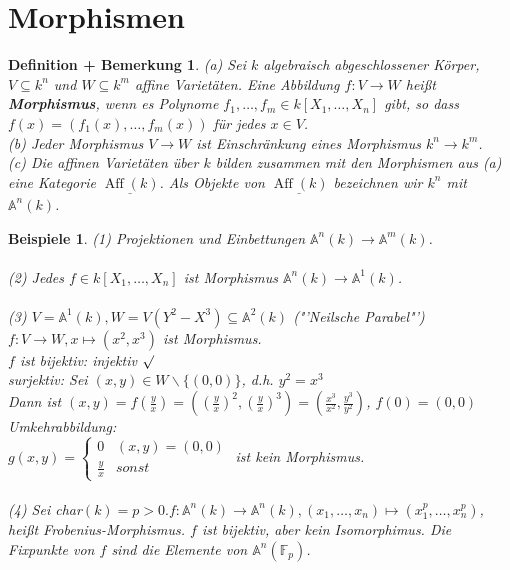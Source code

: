 \documentclass[a4paper,12pt]{report}
\theoremstyle{break}
\newtheorem{DefBem}[Def]{Definition + Bemerkung}
\newtheorem{Bsp}[Def]{Beispiele}
\theoremstyle{nonumberbreak}
\theoremstyle{nonumberplain}
\newcommand{\emp}[1]{\textbf{\emph{#1}}}
\newcommand{\begriff}[1]{{\index{#1}}\emp{#1}}
\begin{document}
\section{Morphismen}
\begin{DefBem}
(a) Sei $k$ algebraisch abgeschlossener Körper, $V\subseteq k^n$ und $W\subseteq k^m$ affine Varietäten. Eine Abbildung $f:V\rightarrow W$ heißt \begriff{Morphismus}, wenn es Polynome $f_1,\dots,f_m\in k[X_1,\dots,X_n]$ gibt, so dass $f(x)=(f_1(x),\dots,f_m(x))$ für jedes $x\in V$.\\
(b) Jeder Morphismus $V\rightarrow W$ ist Einschränkung eines Morphismus $k^n\rightarrow k^m$.\\
(c) Die affinen Varietäten über $k$ bilden zusammen mit den Morphismen aus (a) eine Kategorie $\underline{\operatorname{Aff}(k)}$. Als Objekte von $\underline{\operatorname{Aff}(k)}$ bezeichnen wir $k^n$ mit $\mathbb{A}^n(k)$.
\end{DefBem}
\begin{Bsp}
(1) Projektionen und Einbettungen $\mathbb{A}^n(k) \rightarrow\mathbb{A}^m(k)$.\\\\
(2) Jedes $f\in k[X_1,\dots,X_n]$ ist Morphismus $\mathbb{A}^n(k)\rightarrow\mathbb{A}^1(k)$.\\\\
(3) $V= \mathbb{A}^1(k), W=V(Y^2-X^3)\subseteq \mathbb{A}^2(k)$ ("'Neilsche Parabel"')\\
$f: V\rightarrow W, x\mapsto (x^2,x^3)$ ist Morphismus.\\
$f$ ist bijektiv: injektiv $\surd$\\
surjektiv: Sei $(x,y)\in W\backslash\{(0,0)\}$, d.h. $y^2=x^3$\\
Dann ist $(x,y)= f(\frac{y}{x})= ((\frac{y}{x})^2,(\frac{y}{x})^3)=(\frac{x^3}{x^2},\frac{y^3}{y^2})$, $f(0) = (0,0)$\\
Umkehrabbildung:\\
$g(x,y)=\begin{cases}
0&(x,y)=(0,0)\\
\frac{y}{x}&sonst
\end{cases}$
ist kein Morphismus.\\\\
(4) Sei char$(k)=p>0. f:\mathbb{A}^n(k)\rightarrow\mathbb{A}^n(k), (x_1,\dots,x_n)\mapsto (x_1^p,\dots,x_n^p)$, heißt Frobenius-Morphismus. $f$ ist bijektiv, aber kein Isomorphimus. Die Fixpunkte von $f$ sind die Elemente von $\mathbb{A}^n(\mathbb{F}_p)$.
\end{Bsp}
\end{document}
